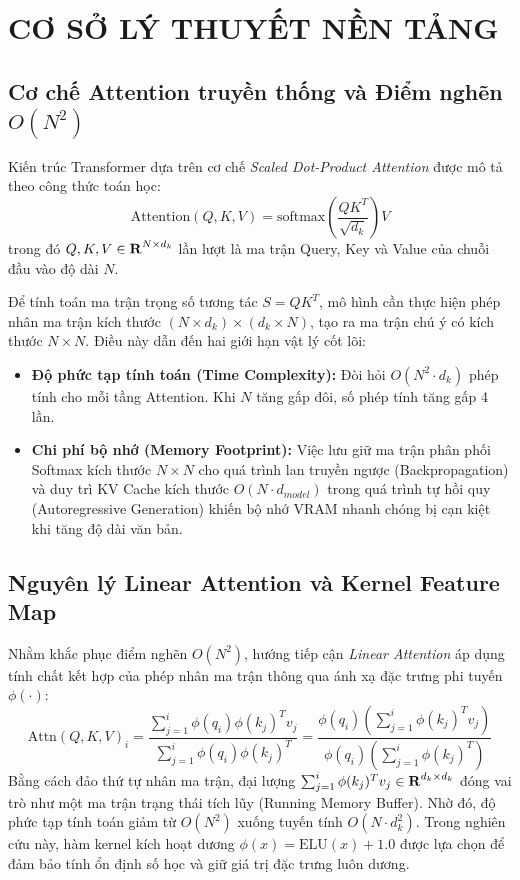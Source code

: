 \documentclass{uetgraduation}
\renewcommand{\mathbb}[1]{\text{\textbf{#1}}}
\begin{document}
\chapter{CƠ SỞ LÝ THUYẾT NỀN TẢNG}
\section{Cơ chế Attention truyền thống và Điểm nghẽn $O(N^2)$}
Kiến trúc Transformer dựa trên cơ chế \textit{Scaled Dot-Product Attention} được mô tả theo công thức toán học:
\begin{equation}
\text{Attention}(Q, K, V) = \text{softmax}\left(\frac{Q K^T}{\sqrt{d_k}}\right) V
\end{equation}
trong đó $Q, K, V \in \mathbb{R}^{N \times d_k}$ lần lượt là ma trận Query, Key và Value của chuỗi đầu vào độ dài $N$.

Để tính toán ma trận trọng số tương tác $S = Q K^T$, mô hình cần thực hiện phép nhân ma trận kích thước $(N \times d_k) \times (d_k \times N)$, tạo ra ma trận chú ý có kích thước $N \times N$. Điều này dẫn đến hai giới hạn vật lý cốt lõi:
\begin{itemize}
    \item \textbf{Độ phức tạp tính toán (Time Complexity):} Đòi hỏi $O(N^2 \cdot d_k)$ phép tính cho mỗi tầng Attention. Khi $N$ tăng gấp đôi, số phép tính tăng gấp 4 lần.
    \item \textbf{Chi phí bộ nhớ (Memory Footprint):} Việc lưu giữ ma trận phân phối Softmax kích thước $N \times N$ cho quá trình lan truyền ngược (Backpropagation) và duy trì KV Cache kích thước $O(N \cdot d_{model})$ trong quá trình tự hồi quy (Autoregressive Generation) khiến bộ nhớ VRAM nhanh chóng bị cạn kiệt khi tăng độ dài văn bản.
\end{itemize}

\section{Nguyên lý Linear Attention và Kernel Feature Map}
Nhằm khắc phục điểm nghẽn $O(N^2)$, hướng tiếp cận \textit{Linear Attention} áp dụng tính chất kết hợp của phép nhân ma trận thông qua ánh xạ đặc trưng phi tuyến $\phi(\cdot)$:
\begin{equation}
\text{Attn}(Q, K, V)_i = \frac{\sum_{j=1}^i \phi(q_i) \phi(k_j)^T v_j}{\sum_{j=1}^i \phi(q_i) \phi(k_j)^T} = \frac{\phi(q_i) \left( \sum_{j=1}^i \phi(k_j)^T v_j \right)}{\phi(q_i) \left( \sum_{j=1}^i \phi(k_j)^T \right)}
\end{equation}
Bằng cách đảo thứ tự nhân ma trận, đại lượng $\sum_{j=1}^i \phi(k_j)^T v_j \in \mathbb{R}^{d_k \times d_k}$ đóng vai trò như một ma trận trạng thái tích lũy (Running Memory Buffer). Nhờ đó, độ phức tạp tính toán giảm từ $O(N^2)$ xuống tuyến tính $O(N \cdot d_k^2)$. Trong nghiên cứu này, hàm kernel kích hoạt dương $\phi(x) = \text{ELU}(x) + 1.0$ được lựa chọn để đảm bảo tính ổn định số học và giữ giá trị đặc trưng luôn dương.
\end{document}
